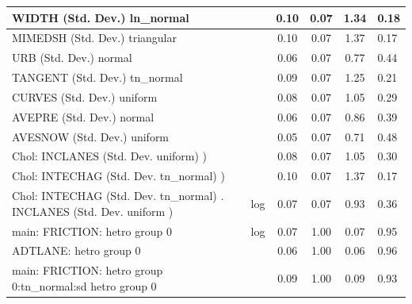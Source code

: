 \begin{table}
\begin{center}
\begin{tabular}{|l|l|c|c|c|l|}
			\hline
			WIDTH (Std. Dev.) ln_normal &  & 0.10 & 0.07 & 1.34 & 0.18 \\
			\hline
			MIMEDSH (Std. Dev.) triangular &  & 0.10 & 0.07 & 1.37 & 0.17 \\
			\hline
			URB (Std. Dev.) normal &  & 0.06 & 0.07 & 0.77 & 0.44 \\
			\hline
			TANGENT (Std. Dev.) tn_normal &  & 0.09 & 0.07 & 1.25 & 0.21 \\
			\hline
			CURVES (Std. Dev.) uniform &  & 0.08 & 0.07 & 1.05 & 0.29 \\
			\hline
			AVEPRE (Std. Dev.) normal &  & 0.06 & 0.07 & 0.86 & 0.39 \\
			\hline
			AVESNOW (Std. Dev.) uniform &  & 0.05 & 0.07 & 0.71 & 0.48 \\
			\hline
			 Chol: INCLANES (Std. Dev. uniform) ) &  & 0.08 & 0.07 & 1.05 & 0.30 \\
			\hline
			 Chol: INTECHAG (Std. Dev. tn_normal) ) &  & 0.10 & 0.07 & 1.37 & 0.17 \\
			\hline
			 Chol: INTECHAG (Std. Dev. tn_normal) . INCLANES (Std. Dev.   uniform ) & log & 0.07 & 0.07 & 0.93 & 0.36 \\
			\hline
			main: FRICTION: hetro group 0 & log & 0.07 & 1.00 & 0.07 & 0.95 \\
			\hline
			ADTLANE: hetro group 0 &  & 0.06 & 1.00 & 0.06 & 0.96 \\
			\hline
			main: FRICTION: hetro group 0:tn_normal:sd  hetro group 0 &  & 0.09 & 1.00 & 0.09 & 0.93 \\
			\hline
		\end{tabular}
	\end{center}
\end{table}